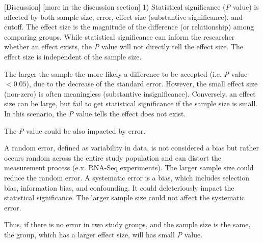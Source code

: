 \documentclass[preprint,12pt]{elsarticle}
\newenvironment{MyColorPar}[1]{%
    \leavevmode\color{#1}\ignorespaces%
}{%
}%
\begin{document}
\begin{MyColorPar}{blue}
\begin{MyColorPar}{red}
[Discussion]
[more in the discussion section]
1) %
Statistical significance (\textit{P} value) is affected by both sample size, error, effect size (substantive significance)\cite{Sullivan2012}\cite{Thiese2016}, and cutoff. 
The effect size is the magnitude of the difference (or relationship) among comparing groups.
While statistical significance can inform the researcher whether an effect exists, 
the \textit{P} value will not directly tell the effect size.
The effect size is independent of the sample size\cite{Sullivan2012}.


The larger the sample the more likely a difference to be accepted (i.e. \textit{P} value $< 0.05$), due to the decrease of the standard error\cite{Sullivan2012}.
However, the small effect size (non-zero) is often meaningless (substantive insignificance).
Conversely, an effect size can be large, but fail to get statistical significance if the sample size is small. In this scenario, the \textit{P} value tells the effect does not exist.

The \textit{P} value could be also impacted by error.
\begin{outline}
\1 A random error, defined as variability in data, is not considered a bias but rather occurs random across the entire study population and can distort the measurement process (e.x. RNA-Seq experiments).
The larger sample size could reduce the random error. 
\1 A systematic error is a bias, which includes selection bias, information bias, and confounding.
It could deleteriously impact the statistical significance.
The larger sample size could not affect the systematic error.
\end{outline}
Thus, if there is no error in two study groups, and the sample size is the same, the group, which has a larger effect size, will has small \textit{P} value\cite{Thiese2016}.


\end{MyColorPar}
\end{MyColorPar}
\end{document}
